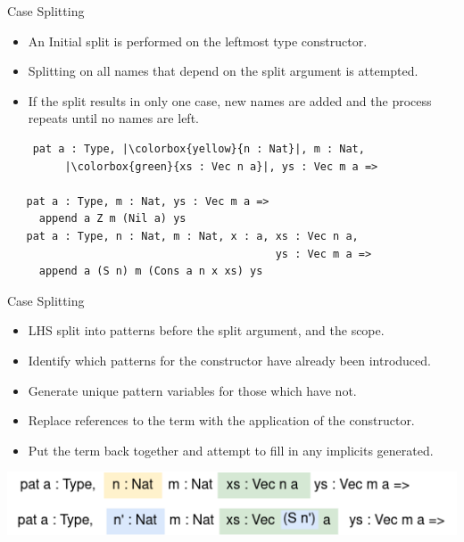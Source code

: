 \documentclass[presentation]{beamer}
\begin{document}
\begin{frame}[fragile]{Case Splitting} 
  \begin{itemize}
  \item An Initial split is performed on the leftmost type constructor.\\
  \item Splitting on all names that depend on the split argument is attempted. \\
  \item If the split results in only one case, new names are added and the process repeats until no names are left. \\ 
  \end{itemize}
  \begin{verbatim}
    pat a : Type, |\colorbox{yellow}{n : Nat}|, m : Nat,
         |\colorbox{green}{xs : Vec n a}|, ys : Vec m a =>

   pat a : Type, m : Nat, ys : Vec m a =>
     append a Z m (Nil a) ys 
   pat a : Type, n : Nat, m : Nat, x : a, xs : Vec n a,
                                          ys : Vec m a =>
     append a (S n) m (Cons a n x xs) ys   
  \end{verbatim}
\end{frame}

\begin{frame}[fragile]{Case Splitting}
\begin{itemize}
\item LHS split into patterns before the split argument, and the scope.
\item Identify which patterns for the constructor have already been introduced.
\item Generate unique pattern variables for those which have not.
\item Replace references to the term with the application of the constructor.
\item Put the term back together and attempt to fill in any implicits generated. 
\end{itemize}
\begin{center}
\includegraphics[scale=.5]{Resource/addSplit.png}
\end{center}
\end{frame}
\end{document}
